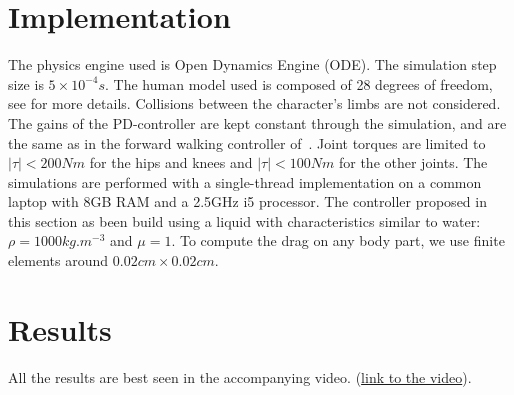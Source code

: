 \documentclass[runningheads,a4paper,10pt]{llncs}
\begin{document}
\section{Implementation}
\label{sec:implementation}
The physics engine used is Open Dynamics Engine (ODE). The simulation step size is $5 \times 10^{-4}s$. The human model used is composed of 28 degrees of freedom, see \citep{coros2009robust} for more details. Collisions between the character's limbs are not considered. The gains of the PD-controller are kept constant through the simulation, and are the same as in the forward walking controller of~\citep{coros2009robust}. Joint torques are limited to $|\tau|<200Nm$  for the hips and knees and $|\tau|<100Nm$  for the other joints. The simulations are performed with a single-thread implementation on a common laptop with 8GB RAM and a 2.5GHz i5 processor. The controller proposed in this section as been build using a liquid with characteristics similar to water: $\rho=1000kg.m^{-3}$ and $\mu=1$. To compute the drag on any body part, we use finite elements around $0.02cm \times 0.02cm$.


\section{Results}
\label{sec:results}

All the results are best seen in the accompanying video. (\href{https://drive.google.com/folderview?id=0B6n5UVMEGbGHfjM5a1phUHZGaUtLNVRNanFDT2xRd19zN0x1UmNabjlCVGN6c1ZFdWRLczA&usp=sharing}{link to the video}).
\end{document}
